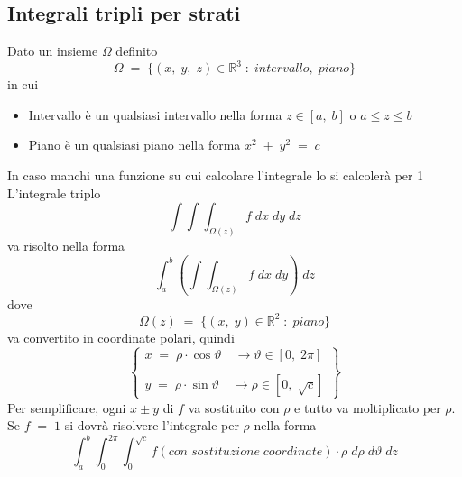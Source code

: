 \documentclass[a4paper, 10pt]{article}
\begin{document}
 			\subsection{Integrali tripli per strati}
 				Dato un insieme $ \Omega $	definito
 					\[
	 					\Omega\; =\; \{ (x,\; y,\; z) \in \mathbb{R}^3\; :\; intervallo,\; piano \}
 					\]
 				in cui
 					\begin{itemize}
 						\item Intervallo è un qualsiasi intervallo nella forma $ z \in [a,\; b] $ o $ a \leq z \leq b $
 						\item Piano è un qualsiasi piano nella forma $ x^2\; +\; y^2\; =\; c $ 
 					\end{itemize}
 				In caso manchi una funzione su cui calcolare l'integrale lo si calcolerà per 1\\
 				L'integrale triplo
 					\[
	 					\int{\int{\int_{\Omega(z)}{f}}}\; dx\;dy\;dz
 					\]
 				va risolto nella forma
 					\[
 						\int_{a}^{b}{\left( \int{\int_{\Omega(z)}{f}}\; dx\; dy \right)}\; dz
 					\]
 				dove
 					\[
 						\Omega(z)\; =\; \{ (x,\; y) \in \mathbb{R}^2\; :\; piano \}
 					\]
 				va convertito in coordinate polari, quindi
 					\[
	 					\left\{ 
		 					\begin{array}{l} 
			 					x\; =\; \rho \cdot \cos{\vartheta}\quad \rightarrow \vartheta \in [0,\; 2\pi] \\
			 					\\ 
			 					y\; =\; \rho \cdot \sin{\vartheta}\quad \rightarrow \rho \in [0,\; \sqrt{c}]
		 					\end{array} 
	 					\right\}
 					\]
 				Per semplificare, ogni $ x \pm y $ di $ f $ va sostituito con $ \rho $ e tutto va moltiplicato per $ \rho $.\\
 				Se $ f\; =\; 1 $ si dovrà risolvere l'integrale per $ \rho $ nella forma
 					\[
	 					\int_{a}^{b}{\int_{0}^{2\pi}{\int_{0}^{\sqrt{c}}{f(con\; sostituzione\; coordinate)\cdot \rho}}}\; d\rho\; d\vartheta\; dz
 					\]
 			
\end{document}
